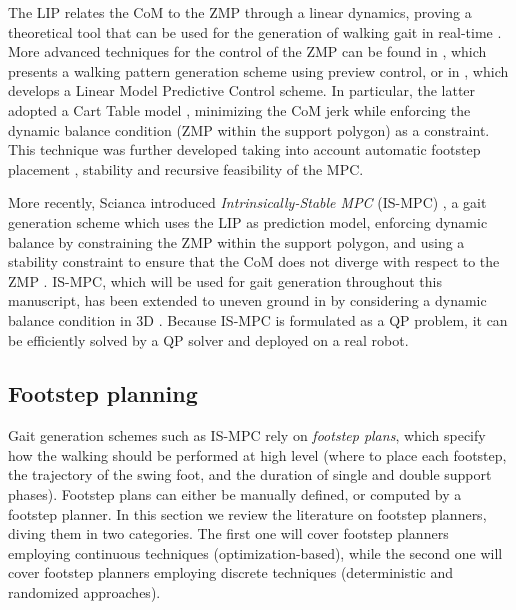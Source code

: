The LIP relates the CoM to the ZMP through a linear dynamics, proving a 
theoretical tool that can be used for the generation of walking gait in 
real-time \cite{Sugihara2002ICRA}. More advanced techniques for the control 
of the ZMP can be found in \cite{Kajita2003BipedWalkingPatternGeneration}, which
presents a walking pattern generation scheme using preview control, or in
\cite{Wieber2006LMPCWalking}, which develops a Linear Model Predictive Control
scheme. In particular, the latter adopted a Cart Table model
\cite{Kajita2016IntroductiontoHumanoidRobotics}, minimizing the CoM jerk while enforcing the dynamic balance
condition (ZMP within the support polygon) as a constraint. This technique
was further developed taking into account automatic footstep placement
\cite{Herdt2010OnlineWalkingMotionGenerationWithAFSP}, stability \cite{Sherikov2014Humanoids}
and recursive feasibility \cite{Ciocca2017Humanoids} of the MPC.

More recently, Scianca introduced
\textit{Intrinsically-Stable MPC} (IS-MPC) \cite{Scianca2016ISMPC, Scianca2020TRO},
a gait generation scheme which 
uses the LIP as prediction model, enforcing dynamic balance
by constraining the ZMP within the support polygon,
and using a stability constraint to ensure that the CoM does not diverge 
with respect to the ZMP \cite{Lanari2015Inversionbasedgaitgeneration}. IS-MPC,
which will be used for gait generation throughout this manuscript,
has been extended to uneven ground in \cite{Zamparelli2018SYROCO} by
considering a dynamic balance condition in 3D
\cite{Caron2017DynamicWalkingOverRoughTerrains, Sugihara2021ICRA}. Because
IS-MPC is formulated as a QP problem, it can be efficiently solved by a 
QP solver and deployed on a real robot.

\subsection{Footstep planning}
Gait generation schemes such as IS-MPC rely on \textit{footstep plans}, which specify 
how the walking should be performed at high level (where to place each footstep,
the trajectory of the swing foot, and the duration of single and double support
phases). Footstep plans can either be manually defined, or computed by a 
footstep planner. In this section we review the literature on footstep planners,
diving them in two categories. The first one will cover footstep planners 
employing continuous techniques (optimization-based),
while the second one will cover footstep planners employing discrete techniques
(deterministic and randomized approaches).

